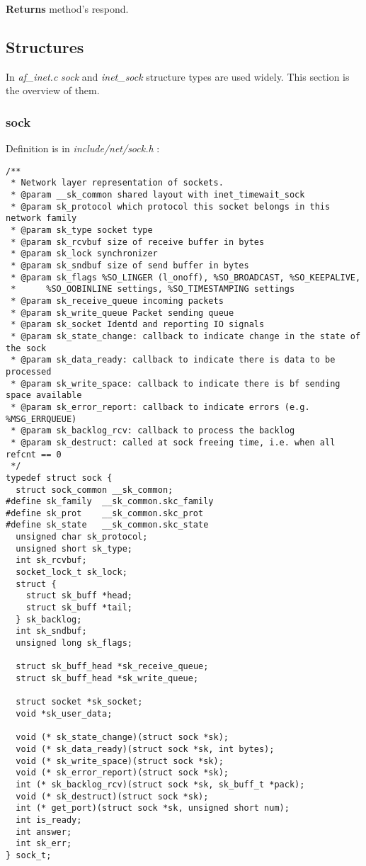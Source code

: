 \documentclass[12pt,a4paper]{article}
\begin{document}
{\bf Returns} method's respond.

\subsection{Structures}
\label{sec:af_inet_structures}
In {\it af\_inet.c} {\it sock} and {\it inet\_sock} structure types are used
widely. This section is the overview of them.
\subsubsection{sock}
Definition is in {\it include/net/sock.h} :
\begin{verbatim}
/**
 * Network layer representation of sockets.
 * @param __sk_common shared layout with inet_timewait_sock
 * @param sk_protocol which protocol this socket belongs in this network family
 * @param sk_type socket type
 * @param sk_rcvbuf size of receive buffer in bytes
 * @param sk_lock synchronizer
 * @param sk_sndbuf size of send buffer in bytes
 * @param sk_flags %SO_LINGER (l_onoff), %SO_BROADCAST, %SO_KEEPALIVE,
 *      %SO_OOBINLINE settings, %SO_TIMESTAMPING settings
 * @param sk_receive_queue incoming packets
 * @param sk_write_queue Packet sending queue
 * @param sk_socket Identd and reporting IO signals
 * @param sk_state_change: callback to indicate change in the state of the sock
 * @param sk_data_ready: callback to indicate there is data to be processed
 * @param sk_write_space: callback to indicate there is bf sending space available
 * @param sk_error_report: callback to indicate errors (e.g. %MSG_ERRQUEUE)
 * @param sk_backlog_rcv: callback to process the backlog
 * @param sk_destruct: called at sock freeing time, i.e. when all refcnt == 0
 */
typedef struct sock {
  struct sock_common __sk_common;
#define sk_family  __sk_common.skc_family
#define sk_prot    __sk_common.skc_prot
#define sk_state   __sk_common.skc_state
  unsigned char sk_protocol;
  unsigned short sk_type;
  int sk_rcvbuf;
  socket_lock_t sk_lock;
  struct {
    struct sk_buff *head;
    struct sk_buff *tail;
  } sk_backlog;
  int sk_sndbuf;
  unsigned long sk_flags;

  struct sk_buff_head *sk_receive_queue;
  struct sk_buff_head *sk_write_queue;

  struct socket *sk_socket;
  void *sk_user_data;

  void (* sk_state_change)(struct sock *sk);
  void (* sk_data_ready)(struct sock *sk, int bytes);
  void (* sk_write_space)(struct sock *sk);
  void (* sk_error_report)(struct sock *sk);
  int (* sk_backlog_rcv)(struct sock *sk, sk_buff_t *pack);
  void (* sk_destruct)(struct sock *sk);
  int (* get_port)(struct sock *sk, unsigned short num);
  int is_ready;
  int answer;
  int sk_err;
} sock_t;

\end{verbatim}
\end{document}
